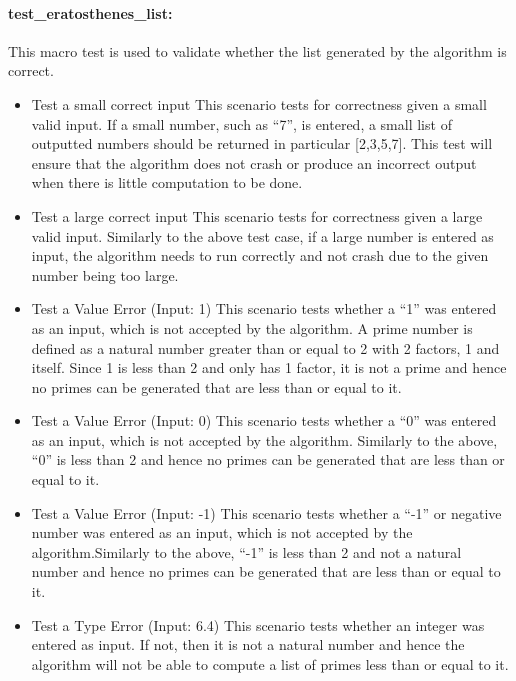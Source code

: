 \documentclass[]{article}
\begin{document}
\paragraph{test\_eratosthenes\_list:}

This macro test is used to validate whether the list generated by the algorithm is correct.

\begin{itemize}
	\item Test a small correct input\hfill \newline\newline
This scenario tests for correctness given a small valid input. If a small number, such as “7”, is entered, a small list of outputted numbers should be returned in particular [2,3,5,7]. This test will ensure that the algorithm does not crash or produce an incorrect output when there is little computation to be done.

	\item Test a large correct input\hfill \newline\newline
This scenario tests for correctness given a large valid input. Similarly to the above test case, if a large number is entered as input, the algorithm needs to run correctly and not crash due to the given number being too large.


	\item Test a Value Error (Input: 1)\hfill \newline\newline
This scenario tests whether a “1” was entered as an input, which is not accepted by the algorithm. A prime number is defined as a natural number greater than or equal to 2 with 2 factors, 1 and itself. Since 1 is less than 2 and only has 1 factor, it is not a prime and hence no primes can be generated that are less than or equal to it.
	\item Test a Value Error (Input: 0)\hfill \newline\newline
This scenario tests whether a “0” was entered as an input, which is not accepted by the algorithm. Similarly to the above, “0” is less than 2 and hence no primes can be generated that are less than or equal to it.
	\item Test a Value Error (Input: -1)\hfill \newline\newline
This scenario tests whether a “-1” or negative number was entered as an input, which is not accepted by the algorithm.Similarly to the above, “-1” is less than 2 and not a natural number and hence no primes can be generated that are less than or equal to it.
	\item Test a Type Error  (Input: 6.4) \hfill \newline\newline
This scenario tests whether an integer was entered as input. If not, then it is not a natural number and hence the algorithm will not be able to compute a list of primes less than or equal to it.
\end{itemize}
\end{document}
